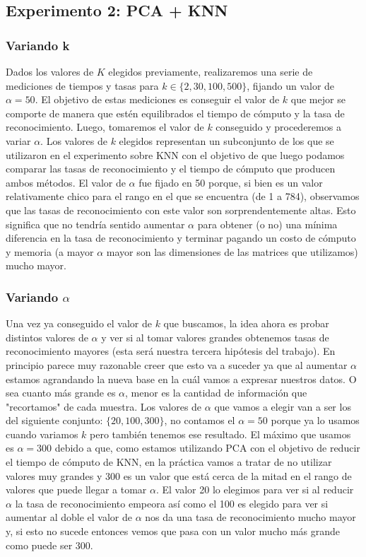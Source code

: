 \subsection{Experimento 2: PCA + KNN}
\subsubsection{Variando k}
Dados los valores de $K$ elegidos previamente, realizaremos una serie de mediciones de tiempos y tasas para $k \in \{2, 30, 100, 500\}$, fijando un valor de $\alpha = 50$. El objetivo de estas mediciones es conseguir el valor de $k$ que mejor se comporte de manera que estén equilibrados el tiempo de cómputo y la tasa de reconocimiento. Luego, tomaremos el valor de $k$ conseguido y procederemos a variar $\alpha$. Los valores de $k$ elegidos representan un subconjunto de los que se utilizaron en el experimento sobre KNN con el objetivo de que luego podamos comparar las tasas de reconocimiento y el tiempo de cómputo que producen ambos métodos. El valor de $\alpha$ fue fijado en 50 porque, si bien es un valor relativamente chico para el rango en el que se encuentra (de 1 a 784), observamos que las tasas de reconocimiento con este valor son sorprendentemente altas. Esto significa que no tendría sentido aumentar $\alpha$ para obtener (o no) una mínima diferencia en la tasa de reconocimiento y terminar pagando un costo de cómputo y memoria (a mayor $\alpha$ mayor son las dimensiones de las matrices que utilizamos) mucho mayor.
\subsubsection{Variando $\alpha$}
Una vez ya conseguido el valor de $k$ que buscamos, la idea ahora es probar distintos valores de $\alpha$ y ver si al tomar valores grandes obtenemos tasas de reconocimiento mayores (esta será nuestra tercera hipótesis del trabajo). En principio parece muy razonable creer que esto va a suceder ya que al aumentar $\alpha$ estamos agrandando la nueva base en la cuál vamos a expresar nuestros datos. O sea cuanto más grande es $\alpha$, menor es la cantidad de información que "recortamos" de cada muestra. Los valores de $\alpha$ que vamos a elegir van a ser los del siguiente conjunto: $\{20, 100, 300\}$, no contamos el $\alpha = 50$ porque ya lo usamos cuando variamos $k$ pero también tenemos ese resultado. El máximo que usamos es $\alpha = 300$ debido a que, como estamos utilizando PCA con el objetivo de reducir el tiempo de cómputo de KNN, en la práctica vamos a tratar de no utilizar valores muy grandes y 300 es un valor que está cerca de la mitad en el rango de valores que puede llegar a tomar $\alpha$. El valor 20 lo elegimos para ver si al reducir $\alpha$ la tasa de reconocimiento empeora así como el 100 es elegido para ver si aumentar al doble el valor de $\alpha$ nos da una tasa de reconocimiento mucho mayor y, si esto no sucede entonces vemos que pasa con un valor mucho más grande como puede ser 300.

